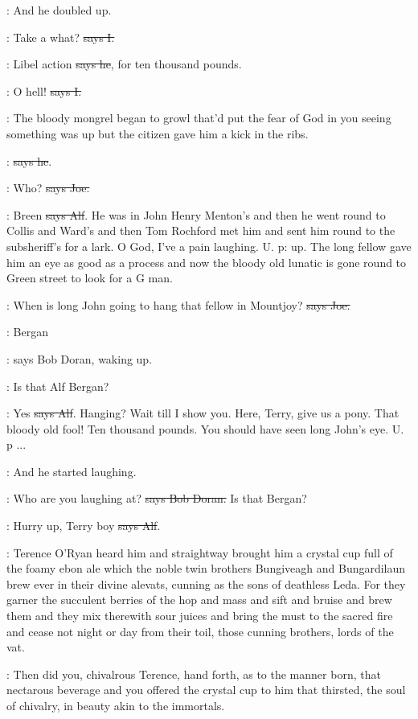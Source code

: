 \Nq:
And he doubled up.

:
Take a what? \sout{says I.}

\bergan:
Libel action \sout{says he},
for ten thousand pounds.

:
O hell! \sout{says I.}

\Nq:
The bloody mongrel began to growl that'd put the fear of God in you
seeing something was up but the citizen gave him a kick in the ribs.

\citizen:
 \sout{says he}.

\joe:
Who? \sout{says Joe.}

\bergan:
Breen \sout{says Alf}.
He was in John Henry Menton's and then he went round
to Collis and Ward's and then Tom Rochford met him and sent him round
to the subsheriff's for a lark. O God, I've a pain laughing. U. p: up. The
long fellow gave him an eye as good as a process and now the bloody old
lunatic is gone round to Green street to look for a G man.

\joe:
When is long John going to hang that fellow in Mountjoy?
\sout{says Joe.}

\doran:
Bergan

\Nq:
says Bob Doran, waking up.

\doran:
Is that Alf Bergan?

\bergan:
Yes \sout{says Alf}. Hanging?
Wait till I show you. Here, Terry, give us a
pony. That bloody old fool! Ten thousand pounds. You should have seen long
John's eye. U. p ...

\Nq:
And he started laughing.

\doran:
Who are you laughing at? \sout{says Bob Doran.}
Is that Bergan?

\bergan:
Hurry up, Terry boy \sout{says Alf}.

:
Terence O'Ryan heard him and straightway brought him a crystal
cup full of the foamy ebon ale which the noble twin brothers Bungiveagh
and Bungardilaun brew ever in their divine alevats, cunning as the sons of
deathless Leda. For they garner the succulent berries of the hop and mass
and sift and bruise and brew them and they mix therewith sour juices and
bring the must to the sacred fire and cease not night or day from their
toil, those cunning brothers, lords of the vat.

:
Then did you, chivalrous Terence, hand forth, as to the manner born,
that nectarous beverage and you offered the crystal cup to him that
thirsted, the soul of chivalry, in beauty akin to the immortals.

